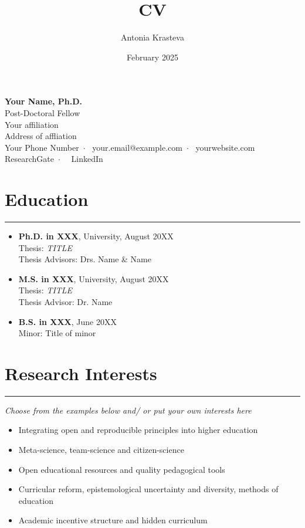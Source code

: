 \documentclass{article}
\title{CV}
\author{Antonia Krasteva}
\date{February 2025}
\makeatletter
\def\name{Your Name, Ph.D.}
\def\position{Post-Doctoral Fellow}
\def\affiliation{Your affiliation}
\def\address{Address of affliation}
\def\phone{Your Phone Number}
\def\email{your.email@example.com}
\def\website{yourwebsite.com}
\def\researchgate{ResearchGate}
\makeatother
\begin{document}
\begin{center}
    {\huge \textbf{\name}}\\
    \vspace{0.2em}
    {\large \position}\\
    \affiliation\\
    \address\\
    \phone \, $\cdot$ \, \email \, $\cdot$ \, \website \\
   \researchgate \, $\cdot$ \, \ LinkedIn
\end{center}

\section*{Education}
\hrule
\vspace{1em}
\begin{itemize}[leftmargin=*]
    \item \textbf{Ph.D. in XXX}, University, August 20XX\\
    Thesis: \textit{TITLE}\\
    Thesis Advisors: Drs. Name \& Name
    \item \textbf{M.S. in XXX}, University, August 20XX\\
    Thesis: \textit{TITLE}\\
    Thesis Advisor: Dr. Name
    \item \textbf{B.S. in XXX}, June 20XX\\
    Minor: Title of minor
\end{itemize}

\section*{Research Interests}
\hrule
\vspace{1em}
\textit {Choose from the examples below and/ or put your own interests here}
\begin{itemize}[leftmargin=*]
    \item Integrating open and reproducible principles into higher education
    \item Meta-science, team-science and citizen-science
    \item Open educational resources and quality pedagogical tools
    \item Curricular reform, epistemological uncertainty and diversity, methods of education
    \item Academic incentive structure and hidden curriculum
\end{itemize}
\end{document}
